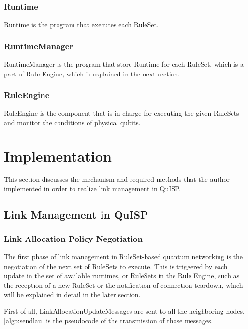 \subsubsection{Runtime}
Runtime is the program that executes each RuleSet.

\subsubsection{RuntimeManager}
RuntimeManager is the program that store Runtime for each RuleSet, which is a part of Rule Engine, which is explained in the next section.

\subsubsection{RuleEngine}
RuleEngine is the component that is in charge for executing the given RuleSets and monitor the conditions of physical qubits.


\section{Implementation}

This section discusses the mechanism and required methods that the author implemented in order to realize link management in QuISP.

\subsection{Link Management in QuISP}

\subsubsection{Link Allocation Policy Negotiation}
The first phase of link management in RuleSet-based quantum networking is the negotiation of the next set of RuleSets to execute.
This is triggered by each update in the set of available runtimes, or RuleSets in the Rule Engine, such as the reception of a new RuleSet or the notification of connection teardown, which will be explained in detail in the later section.

First of all, LinkAllocationUpdateMessages are sent to all the neighboring nodes. \ref{algo:sendlau} is the pseudocode of the transmission of those messages.

